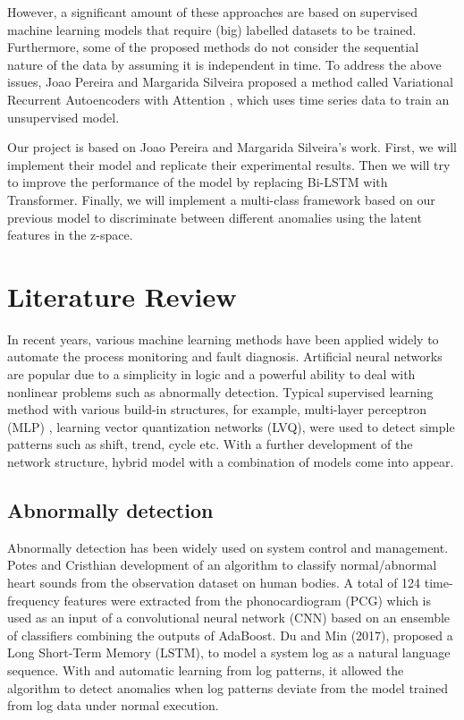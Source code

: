 \documentclass{article}
\begin{document}
However, a significant amount of these approaches are based on supervised machine learning models that require (big) labelled datasets to be trained. Furthermore, some of the proposed methods do not consider the sequential nature of the data by assuming it is independent in time. To address the above issues, Joao Pereira and Margarida Silveira proposed a method called Variational Recurrent Autoencoders with Attention \cite{AuthorJM}, which uses time series data to train an unsupervised model. 

Our project is based on Joao Pereira and Margarida Silveira's work. First, we will implement their model and replicate their experimental results. Then we will try to improve the performance of the model by replacing Bi-LSTM with Transformer. Finally, we will implement a multi-class framework based on our previous model to discriminate between different anomalies using the latent features in the z-space.

\section{Literature Review}
In recent years, various machine learning methods have been applied widely to automate the process monitoring and fault diagnosis. Artificial neural networks are popular due to a simplicity in logic and a powerful ability to deal with nonlinear problems such as abnormally detection. Typical supervised learning method with various build-in structures, for example, multi-layer perceptron (MLP) \cite{AuthorSI}, learning vector quantization networks (LVQ), were used to detect simple patterns such as shift, trend, cycle etc. With a further development of the network structure, hybrid model with a combination of models come into appear.

\subsection{Abnormally detection}
Abnormally detection has been widely used on system control and management. Potes and Cristhian development of an algorithm to classify normal/abnormal heart sounds from the observation dataset on human bodies. A total of 124 time-frequency features were extracted from the phonocardiogram (PCG) which is used as an input of a convolutional neural network (CNN) based on an ensemble of classifiers combining the outputs of AdaBoost. \cite{AuthorPotes} Du and Min (2017), proposed a Long Short-Term
Memory (LSTM), to model a system log as a natural language sequence. With and automatic learning from log patterns, it allowed the algorithm to detect anomalies when log patterns deviate from the model trained from log data under normal execution. \cite{AuthorDu}
\end{document}
